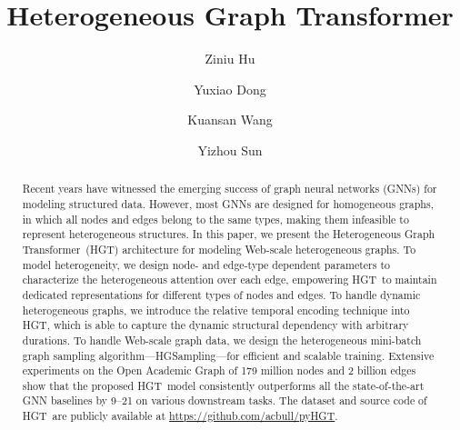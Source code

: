\documentclass[sigconf]{acmart}
\theoremstyle{definition}
\newcommand{\model}{Heterogeneous Graph Transformer}
\newcommand{\short}{HGT}
\newcommand{\sampling}{HGSampling}
\begin{document}
\title{Heterogeneous Graph Transformer}


\author{Ziniu Hu}


\author{Yuxiao Dong}

\author{Kuansan Wang}

\author{Yizhou Sun}



\begin{abstract}
Recent years have witnessed the emerging success of graph neural networks (GNNs) for modeling structured data. 
However, most GNNs are designed for homogeneous graphs, in which all nodes and edges belong to the same types, making them infeasible to represent  heterogeneous structures. 
In this paper, we present the \model\ (\short) architecture for modeling Web-scale heterogeneous graphs. 
To model heterogeneity, we design node- and edge-type dependent parameters to characterize the heterogeneous attention over each edge, empowering \short\ to maintain dedicated representations for different types of nodes and edges. 
To handle dynamic heterogeneous graphs, we introduce the relative temporal encoding technique into \short, which is able to capture the dynamic structural dependency with arbitrary durations. 
To handle Web-scale graph data, we design the heterogeneous mini-batch graph sampling algorithm---\sampling---for efficient and scalable training. 
Extensive experiments on the Open Academic Graph of 179 million nodes and 2 billion edges show that the proposed \short\ model consistently outperforms all the state-of-the-art GNN baselines by 9--21 on various downstream tasks. The dataset and source code of \short\ are publicly available at \url{https://github.com/acbull/pyHGT}. 




\end{abstract}
\end{document}
